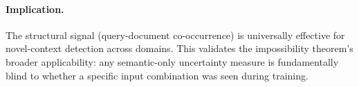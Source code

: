 \documentclass{article}
\begin{document}
\paragraph{Implication.}
The structural signal (query-document co-occurrence) is universally effective for novel-context detection across domains. This validates the impossibility theorem's broader applicability: any semantic-only uncertainty measure is fundamentally blind to whether a specific input combination was seen during training.

\newpage

\end{document}
